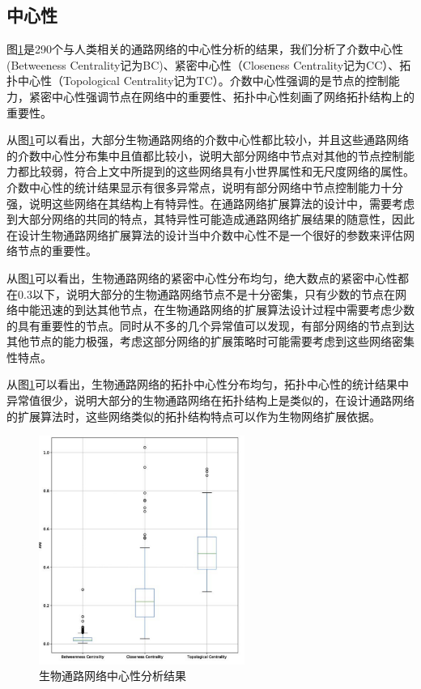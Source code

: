 \subsection{中心性}
图\ref{fig29}是290个与人类相关的通路网络的中心性分析的结果，我们分析了介数中心性(Betweeness Centrality记为BC)、紧密中心性（Closeness Centrality记为CC）、拓扑中心性（Topological Centrality记为TC）。介数中心性强调的是节点的控制能力，紧密中心性强调节点在网络中的重要性、拓扑中心性刻画了网络拓扑结构上的重要性。

从图\ref{fig29}可以看出，大部分生物通路网络的介数中心性都比较小，并且这些通路网络的介数中心性分布集中且值都比较小，说明大部分网络中节点对其他的节点控制能力都比较弱，符合上文中所提到的这些网络具有小世界属性和无尺度网络的属性。介数中心性的统计结果显示有很多异常点，说明有部分网络中节点控制能力十分强，说明这些网络在其结构上有特异性。在通路网络扩展算法的设计中，需要考虑到大部分网络的共同的特点，其特异性可能造成通路网络扩展结果的随意性，因此在设计生物通路网络扩展算法的设计当中介数中心性不是一个很好的参数来评估网络节点的重要性。

从图\ref{fig29}可以看出，生物通路网络的紧密中心性分布均匀，绝大数点的紧密中心性都在0.3以下，说明大部分的生物通路网络节点不是十分密集，只有少数的节点在网络中能迅速的到达其他节点，在生物通路网络的扩展算法设计过程中需要考虑少数的具有重要性的节点。同时从不多的几个异常值可以发现，有部分网络的节点到达其他节点的能力极强，考虑这部分网络的扩展策略时可能需要考虑到这些网络密集性特点。

从图\ref{fig29}可以看出，生物通路网络的拓扑中心性分布均匀，拓扑中心性的统计结果中异常值很少，说明大部分的生物通路网络在拓扑结构上是类似的，在设计通路网络的扩展算法时，这些网络类似的拓扑结构特点可以作为生物网络扩展依据。

\begin{figure}[h]
\centering
\includegraphics[width = 0.6\textwidth]{center_summary}
\caption[fig29]{生物通路网络中心性分析结果}
\label{fig29}
\end{figure}

